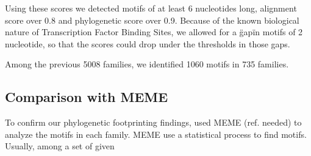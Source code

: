 Using these scores we detected motifs of at least 6 nucleotides long, alignment score over 0.8 and phylogenetic score over 0.9. Because of the known biological nature of Transcription Factor Binding Sites, we allowed for a \"gap\" in motifs of 2 nucleotide, so that the scores could drop under the thresholds in those gaps.

Among the previous 5008 families, we identified 1060 motifs in 735 families.

\subsection*{Comparison with MEME}

To confirm our phylogenetic footprinting findings, used MEME (ref. needed) to analyze the motifs in each family. MEME use a statistical process to find motifs. Usually, among a set of given

